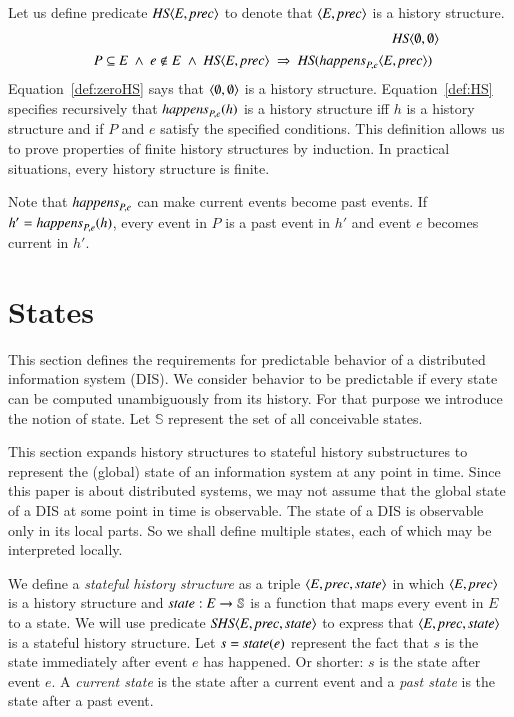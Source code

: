 \documentclass{elsarticle}
\def\id#1{\text{\em #1\/}}
\def\Events{{\mathit E}}
\begin{document}
	Let us define predicate $\id{HS}\la \Events, \id{prec}\ra$
	to denote that $\la \Events, \id{prec}\ra$ is a history structure.
\begin{eqnarray}
	&&\id{HS}\la \emptyset, \emptyset\ra\label{def:zeroHS}\\
&&\begin{array}{@{}l}
	P\subseteq\Events\ \wedge\ e\notin E\ \wedge\ \id{HS}\la \Events, \id{prec}\ra\ \Rightarrow\ \id{HS}(\id{happens}_{P,e}\la \Events, \id{prec}\ra)
\end{array}
\label{def:HS}
\end{eqnarray}
	Equation~\ref{def:zeroHS} says that $\langle \emptyset, \emptyset\rangle$ is a history structure.
	Equation~\ref{def:HS} specifies recursively that $\id{happens}_{P,e}(h)$ is a history structure iff
	$h$ is a history structure and if $P$ and $e$ satisfy the specified conditions.
	This definition allows us to prove properties of finite history structures by induction.
	In practical situations, every history structure is finite.

	Note that $\id{happens}_{P,e}$ can make current events become past events.
	If $h'=\id{happens}_{P,e}(h)$, every event in $P$ is a past event in $h'$ and event $e$ becomes current in $h'$.

\section{States}
	This section defines the requirements for predictable behavior of a distributed information system (DIS).
	We consider behavior to be predictable if every state can be computed unambiguously from its history.
	For that purpose we introduce the notion of state.
	Let $\mathbb S$ represent the set of all conceivable states.

	This section expands history structures to stateful history substructures
	to represent the (global) state of an information system at any point in time.
	Since this paper is about distributed systems,
	we may not assume that the global state of a DIS at some point in time is observable.
	The state of a DIS is observable only in its local parts.
	So we shall define multiple states, each of which may be interpreted locally.

	We define a {\em stateful history structure} as a triple $\la\Events, \id{prec}, \id{state}\ra$ in which
	$\la \Events, \id{prec}\ra$ is a history structure and $\id{state}:\Events\rightarrow{\mathbb S}$ is a function
	that maps every event in $\Events$ to a state.
	We will use predicate $\id{SHS}\la \Events, \id{prec}, \id{state}\ra$
	to express that $\la \Events, \id{prec}, \id{state}\ra$ is a stateful history structure.
	Let $s=\id{state}(e)$ represent the fact that $s$ is the state immediately after event $e$ has happened.
	Or shorter: $s$ is the state after event $e$.
	A {\em current state} is the state after a current event
	and a {\em past state} is the state after a past event.
\end{document}
